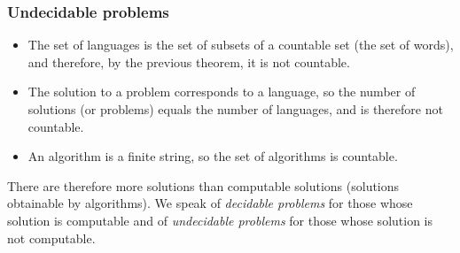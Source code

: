 \documentclass[compress,dvipdfmx]{beamer}
\begin{document}
%
\begin{frame}
\frametitle{Undecidable problems}

\begin{itemize}

  \item The set of languages is the set of subsets of a countable
  set (the set of words), and therefore, by the previous theorem, it
  is not countable.

  \item The solution to a problem corresponds to a language, so the
  number of solutions (or problems) equals the number of languages,
  and is therefore not countable.

  \item An algorithm is a finite string, so the set of algorithms is
  countable.

\end{itemize}

There are therefore more solutions than computable solutions
(solutions obtainable by algorithms). We speak of \emph{decidable
problems} for those whose solution is computable and of
\emph{undecidable problems} for those whose solution is not
computable.

\end{frame}

%
\begin{frame}


\end{frame}
\end{document}
